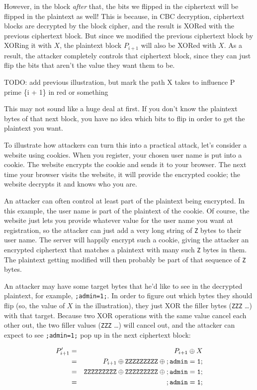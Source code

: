 \documentclass[11pt,ebook,table,dvipsnames]{memoir}
\begin{document}
However, in the block \emph{after} that, the bits we flipped in the
ciphertext will be flipped in the plaintext as well! This is because,
in CBC decryption, ciphertext blocks are decrypted by the block
cipher, and the result is XORed with the previous ciphertext block.
But since we modified the previous ciphertext block by XORing it with
$X$, the plaintext block $P_{i + 1}$ will also be XORed with $X$. As a
result, the attacker completely controls that ciphertext block, since
they can just flip the bits that aren't the value they want them to
be.

TODO: add previous illustration, but mark the path X takes to
influence P prime \{i + 1\} in red or something

This may not sound like a huge deal at first. If you don't know the
plaintext bytes of that next block, you have no idea which bits to
flip in order to get the plaintext you want.

To illustrate how attackers can turn this into a practical attack,
let's consider a website using cookies. When you register, your chosen
user name is put into a cookie. The website encrypts the cookie and
sends it to your browser. The next time your browser visits the
website, it will provide the encrypted cookie; the website decrypts it
and knows who you are.

An attacker can often control at least part of the plaintext being
encrypted. In this example, the user name is part of the plaintext of
the cookie. Of course, the website just lets you provide whatever
value for the user name you want at registration, so the attacker can
just add a very long string of \verb~Z~ bytes to their user name. The
server will happily encrypt such a cookie, giving the attacker an
encrypted ciphertext that matches a plaintext with many such \verb~Z~ bytes in
them. The plaintext getting modified will then probably be part of
that sequence of \verb~Z~ bytes.

An attacker may have some target bytes that he'd like to see in the
decrypted plaintext, for example, \verb*|;admin=1;|. In order to
figure out which bytes they should flip (so, the value of $X$ in the
illustration), they just XOR the filler bytes (\verb~ZZZ~ \ldots) with that
target. Because two XOR operations with the same value cancel each
other out, the two filler values (\verb~ZZZ~ \ldots) will cancel out, and
the attacker can expect to see \verb|;admin=1;| pop up in the next
ciphertext block:

\begin{eqnarray*}
P^{\prime}_{i + 1} & = & P_{i + 1} \oplus X \\
& = & P_{i + 1}
  \oplus \mathtt{ZZZZZZZZZ}
  \oplus \mathtt{;admin=1;} \\
& = & \mathtt{ZZZZZZZZZ}
  \oplus \mathtt{ZZZZZZZZZ}
  \oplus \mathtt{;admin=1;} \\
& = &  \mathtt{;admin=1;} \\
\end{eqnarray*}
\end{document}
